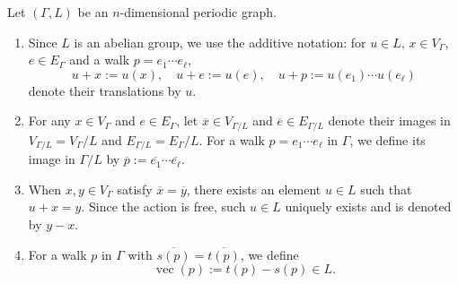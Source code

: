 \begin{defn}\label{defi:peri}
Let $(\Gamma,L)$ be an $n$-dimensional periodic graph.
\begin{enumerate}
\item Since $L$ is an abelian group, we use the additive notation: 
for $u \in L$, $x \in V_{\Gamma}$, $e \in E_{\Gamma}$ and a walk $p = e_1 \cdots e_{\ell}$,
\[
u+x := u(x), \quad u+e := u(e), \quad u+p := u(e_1) \cdots u(e_{\ell})
\]
denote their translations by $u$. 

\item 
For any $x \in V_{\Gamma}$ and $e \in E_{\Gamma}$, 
let $\overline{x} \in V_{\Gamma /L}$ and $\overline{e} \in E_{\Gamma /L}$ denote their images in 
$V_{\Gamma /L} = V_{\Gamma} /L$ and $E_{\Gamma /L} = E_{\Gamma} /L$. 
For a walk $p = e_1 \cdots e_{\ell}$ in $\Gamma$, we define its image in $\Gamma /L$ by $\overline{p} := \overline{e_1} \cdots \overline{e_{\ell}}$. 

\item 
When $x, y \in V_{\Gamma}$ satisfy $\overline{x} = \overline{y}$, there exists an element $u \in L$ such that $u + x = y$. 
Since the action is free, such $u \in L$ uniquely exists and is denoted by $y - x$. 

\item 
For a walk $p$ in $\Gamma$ with $\overline{s(p)} = \overline{t(p)}$, we define 
\[
\operatorname{vec}(p) := t(p) - s(p) \in L. 
\]
\end{enumerate}
\end{defn}

